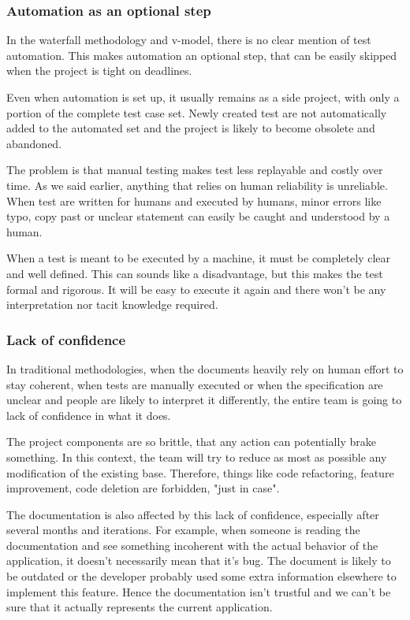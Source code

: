 \subsubsection{Automation as an optional step}
In the waterfall methodology and v-model, there is no clear mention of test
automation.
This makes automation an optional step, that can be easily skipped when the
project is tight on deadlines.

Even when automation is set up, it usually remains as a side project, with
only a portion of the complete test case set.
Newly created test are not automatically added to the automated set and the
project is likely to become obsolete and abandoned.

The problem is that manual testing makes test less replayable and costly over
time.
As we said earlier, anything that relies on human reliability is unreliable.
When test are written for humans and executed by humans, minor errors like
typo, copy past or unclear statement can easily be caught and
understood by a human.

When a test is meant to be executed by a machine, it must be completely clear
and well defined.
This can sounds like a disadvantage, but this makes the test formal and
rigorous.
It will be easy to execute it again and there won't be any interpretation nor
tacit knowledge required.

\subsubsection{Lack of confidence}
In traditional methodologies, when the documents heavily rely on human
effort to stay coherent, when tests are manually executed or when the
specification are unclear and people are likely to interpret it differently,
the entire team is going to lack of confidence in what it does.

The project components are so brittle, that any action can potentially brake
something.
In this context, the team will try to reduce as most as possible any
modification of the existing base.
Therefore, things like code refactoring, feature improvement, code deletion
are forbidden, "just in case".

The documentation is also affected by this lack of confidence, especially after
several months and iterations.
For example, when someone is reading the documentation and see something
incoherent with the actual behavior of the application, it doesn't
necessarily mean that it's bug.
The document is likely to be outdated or the developer probably used some
extra information elsewhere to implement this feature.
Hence the documentation isn't trustful and we can't be sure that it actually
represents the current application.

